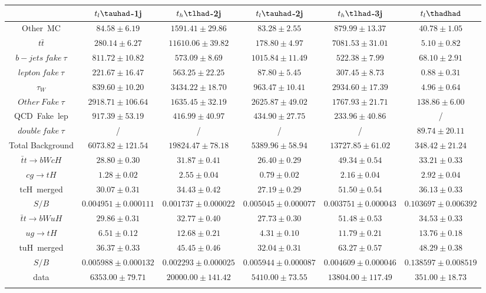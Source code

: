 \centering
\begin{tabular}{cccccc} \toprule\toprule
 & $t_{l}\tauhad$-1j & $t_{h}\tlhad$-2j & $t_{l}\tauhad$-2j & $t_{h}\tlhad$-3j & $t_{l}\thadhad$\\\midrule
Other~MC & $84.58\pm6.19$ & $1591.41\pm29.86$ & $83.28\pm2.55$ & $879.99\pm13.37$ & $40.78\pm1.05$\\
$t\bar{t}$ & $280.14\pm6.27$ & $11610.06\pm39.82$ & $178.80\pm4.97$ & $7081.53\pm31.01$ & $5.10\pm0.82$\\
$b-jets~fake~\tau$ & $811.72\pm10.82$ & $573.09\pm8.69$ & $1015.84\pm11.49$ & $522.38\pm7.99$ & $68.10\pm2.91$\\
$lepton~fake~\tau$ & $221.67\pm16.47$ & $563.25\pm22.25$ & $87.80\pm5.45$ & $307.45\pm8.73$ & $0.88\pm0.31$\\
$\tau_{W}$ & $839.60\pm10.20$ & $3434.22\pm18.70$ & $963.47\pm10.41$ & $2934.60\pm17.39$ & $4.96\pm0.64$\\
$Other~Fake~\tau$ & $2918.71\pm106.64$ & $1635.45\pm32.19$ & $2625.87\pm49.02$ & $1767.93\pm21.71$ & $138.86\pm6.00$\\
QCD~Fake~lep & $917.39\pm53.19$ & $416.99\pm40.97$ & $434.90\pm27.75$ & $233.96\pm40.86$ &  /\\
$double~fake~\tau$ &  / &  / &  / &  / & $89.74\pm20.11$\\\midrule
Total Background & $6073.82\pm121.54$ & $19824.47\pm78.18$ & $5389.96\pm58.94$ & $13727.85\pm61.02$ & $348.42\pm21.24$\\\midrule\midrule
$\bar{t}t\to bWcH$ & $28.80\pm0.30$ & $31.87\pm0.41$ & $26.40\pm0.29$ & $49.34\pm0.54$ & $33.21\pm0.33$\\
$cg\to tH$ & $1.28\pm0.02$ & $2.55\pm0.04$ & $0.79\pm0.02$ & $2.16\pm0.04$ & $2.92\pm0.04$\\
tcH~merged & $30.07\pm0.31$ & $34.43\pm0.42$ & $27.19\pm0.29$ & $51.50\pm0.54$ & $36.13\pm0.33$\\
$S/B$   &  $0.004951\pm0.000111$ &    $0.001737\pm0.000022$ &  $0.005045\pm0.000077$ &  $0.003751\pm0.000043$ & $0.103697\pm0.006392$ \\ \midrule

$\bar{t}t\to bWuH$ & $29.86\pm0.31$ & $32.77\pm0.40$ & $27.73\pm0.30$ & $51.48\pm0.53$ & $34.53\pm0.33$\\
$ug\to tH$ & $6.51\pm0.12$ & $12.68\pm0.21$ & $4.31\pm0.10$ & $11.79\pm0.21$ & $13.76\pm0.18$\\
tuH~merged & $36.37\pm0.33$ & $45.45\pm0.46$ & $32.04\pm0.31$ & $63.27\pm0.57$ & $48.29\pm0.38$\\
$S/B$ & $0.005988\pm0.000132$ &  $0.002293\pm0.000025$&  $0.005944\pm0.000087$ & $0.004609\pm0.000046$ & $0.138597\pm0.008519$\\\midrule\midrule
data & $6353.00\pm79.71$ & $20000.00\pm141.42$ & $5410.00\pm73.55$ & $13804.00\pm117.49$ & $351.00\pm18.73$\\
\bottomrule\bottomrule\\
\end{tabular}


